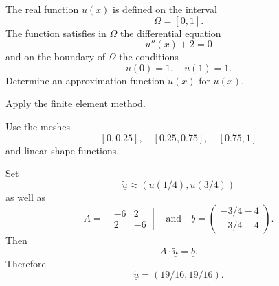 The real function $u(x)$ is defined on the interval
\[
\Omega = [0, 1].
\]
The function satisfies in $\Omega$ the differential equation
\[
u''(x) + 2 = 0
\]
and on the boundary of $\Omega$  the conditions
\[
u(0) = 1, \quad u(1) = 1.
\]
Determine an approximation function $\tilde u(x)$ for $u(x)$.

\bigskip

Apply the finite element method. 

\bigskip

Use the meshes
\[
[0,0.25], \quad
[0.25, 0.75], \quad
[0.75, 1]
\]
and linear shape functions.

\begin{loesung}
Set
\[
\underline{\tilde u} \approx (u(1/4), u(3/4))
\]
as well as 
\[
A
=
\left[\begin{array}{rr} -6 & 2 \\
2 & -6
\end{array}\right]
\quad \text{and} \quad
\underline{b}
=
\left(\begin{array}{r} -3/4-4 \\
-3/4-4 \end{array}\right).
\]
Then
\[
A \cdot \underline{\tilde u} = \underline{b}.
\]
Therefore
\[
\underline{\tilde u} = (19/16, 19/16).
\]
\end{loesung}

